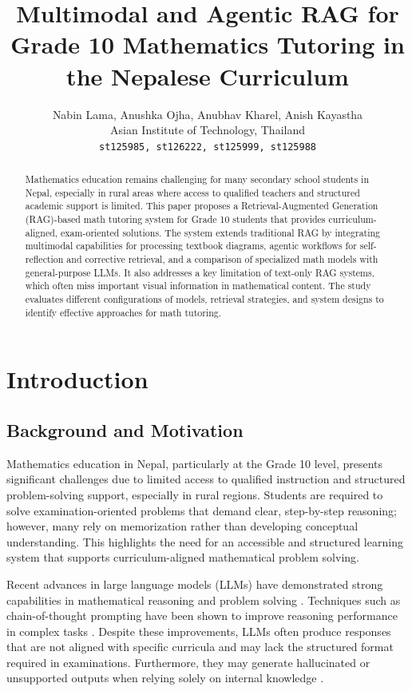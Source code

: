 \documentclass[11pt]{article}
\title{Multimodal and Agentic RAG for Grade 10 Mathematics Tutoring in the Nepalese Curriculum}
\author{
Nabin Lama, Anushka Ojha, Anubhav Kharel, Anish Kayastha \\
Asian Institute of Technology, Thailand \\
\texttt{st125985, st126222, st125999, st125988}
}
\begin{document}
\maketitle

\begin{abstract}
Mathematics education remains challenging for many secondary school students in Nepal, especially in rural areas where access to qualified teachers and structured academic support is limited. This paper proposes a Retrieval-Augmented Generation (RAG)-based math tutoring system for Grade 10 students that provides curriculum-aligned, exam-oriented solutions. The system extends traditional RAG by integrating multimodal capabilities for processing textbook diagrams, agentic workflows for self-reflection and corrective retrieval, and a comparison of specialized math models with general-purpose LLMs. It also addresses a key limitation of text-only RAG systems, which often miss important visual information in mathematical content. The study evaluates different configurations of models, retrieval strategies, and system designs to identify effective approaches for math tutoring.
\end{abstract}

\section{Introduction}

\subsection{Background and Motivation}

Mathematics education in Nepal, particularly at the Grade 10 level, presents significant challenges due to limited access to qualified instruction and structured problem-solving support, especially in rural regions. Students are required to solve examination-oriented problems that demand clear, step-by-step reasoning; however, many rely on memorization rather than developing conceptual understanding. This highlights the need for an accessible and structured learning system that supports curriculum-aligned mathematical problem solving.

Recent advances in large language models (LLMs) have demonstrated strong capabilities in mathematical reasoning and problem solving \cite{cobbe2021training, wei2022chain}. Techniques such as chain-of-thought prompting have been shown to improve reasoning performance in complex tasks \cite{wei2022chain}. Despite these improvements, LLMs often produce responses that are not aligned with specific curricula and may lack the structured format required in examinations. Furthermore, they may generate hallucinated or unsupported outputs when relying solely on internal knowledge \cite{cobbe2021training, bubeck2023sparks}.
\end{document}
